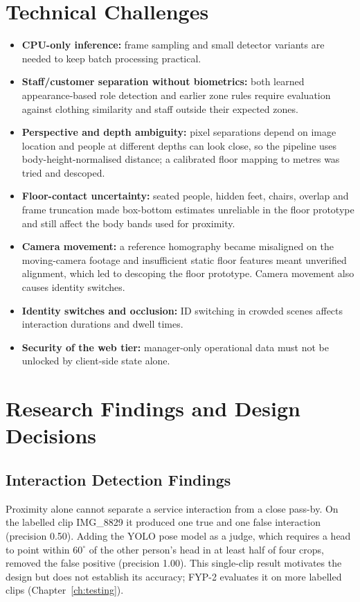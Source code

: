 \section{Technical Challenges}
\begin{itemize}
\item \textbf{CPU-only inference:} frame sampling and small detector variants are needed to keep batch processing practical.
\item \textbf{Staff/customer separation without biometrics:} both learned appearance-based role detection and earlier zone rules require evaluation against clothing similarity and staff outside their expected zones.
\item \textbf{Perspective and depth ambiguity:} pixel separations depend on image location and people at different depths can look close, so the pipeline uses body-height-normalised distance; a calibrated floor mapping to metres was tried and descoped.
\item \textbf{Floor-contact uncertainty:} seated people, hidden feet, chairs, overlap and frame truncation made box-bottom estimates unreliable in the floor prototype and still affect the body bands used for proximity.
\item \textbf{Camera movement:} a reference homography became misaligned on the moving-camera footage and insufficient static floor features meant unverified alignment, which led to descoping the floor prototype. Camera movement also causes identity switches.
\item \textbf{Identity switches and occlusion:} ID switching in crowded scenes affects interaction durations and dwell times.
\item \textbf{Security of the web tier:} manager-only operational data must not be unlocked by client-side state alone.
\end{itemize}

\section{Research Findings and Design Decisions}
\subsection{Interaction Detection Findings}
Proximity alone cannot separate a service interaction from a close pass-by. On the labelled clip IMG\_8829 it produced one true and one false interaction (precision 0.50). Adding the YOLO pose model as a judge, which requires a head to point within $60^\circ$ of the other person's head in at least half of four crops, removed the false positive (precision 1.00). This single-clip result motivates the design but does not establish its accuracy; FYP-2 evaluates it on more labelled clips (Chapter~\ref{ch:testing}).

